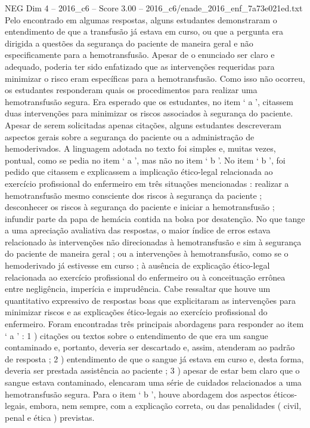 \begin{textsample}{NEG Dim 4 – 2016\_c6 – Score 3.00 – 2016\_c6/enade\_2016\_enf\_7a73e021ed.txt}
Pelo encontrado em algumas respostas, alguns estudantes demonstraram o entendimento de que a transfusão já estava em curso, ou que a pergunta era dirigida a questões da segurança do paciente de maneira geral e não especificamente para a hemotransfusão.
Apesar de o enunciado ser claro e adequado, poderia ter sido enfatizado que as intervenções requeridas para minimizar o risco eram específicas para a hemotransfusão.
Como isso não ocorreu, os estudantes responderam quais os procedimentos para realizar uma hemotransfusão segura.
Era esperado que os estudantes, no item ‘ a ’, citassem duas intervenções para minimizar os riscos associados à segurança do paciente.
Apesar de serem solicitadas apenas citações, alguns estudantes descreveram aspectos gerais sobre a segurança do paciente ou a administração de hemoderivados.
A linguagem adotada no texto foi simples e, muitas vezes, pontual, como se pedia no item ‘ a ’, mas não no item ‘ b ’.
No item ‘ b ’, foi pedido que citassem e explicassem a implicação ético-legal relacionada ao exercício profissional do enfermeiro em três situações mencionadas : realizar a hemotransfusão mesmo consciente dos riscos à segurança da paciente ; desconhecer os riscos à segurança do paciente e iniciar a hemotransfusão ; infundir parte da papa de hemácia contida na bolsa por desatenção.
No que tange a uma apreciação avaliativa das respostas, o maior índice de erros estava relacionado às intervenções não direcionadas à hemotransfusão e sim à segurança do paciente de maneira geral ; ou a intervenções à hemotransfusão, como se o hemoderivado já estivesse em curso ; à ausência de explicação ético-legal relacionada ao exercício profissional do enfermeiro ou à conceituação errônea entre negligência, imperícia e imprudência.
Cabe ressaltar que houve um quantitativo expressivo de respostas boas que explicitaram as intervenções para minimizar riscos e as explicações ético-legais ao exercício profissional do enfermeiro.
Foram encontradas três principais abordagens para responder ao item ‘ a ’ : 1 ) citações ou textos sobre o entendimento de que era um sangue contaminado e, portanto, deveria ser descartado e, assim, atenderam ao padrão de resposta ; 2 ) entendimento de que o sangue já estava em curso e, desta forma, deveria ser prestada assistência ao paciente ; 3 ) apesar de estar bem claro que o sangue estava contaminado, elencaram uma série de cuidados relacionados a uma hemotransfusão segura.
Para o item ‘ b ’, houve abordagem dos aspectos éticos-legais, embora, nem sempre, com a explicação correta, ou das penalidades ( civil, penal e ética ) previstas.

\end{textsample}

